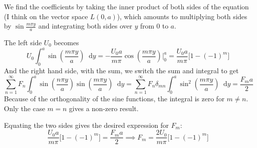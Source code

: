 \documentclass[11pt, a4paper]{article}
\newcommand{\diff}{\mathop{}\!\mathrm{d}} %
\begin{document}
\begin{itemize}
\begin{itemize}
		We find the coefficients by taking the inner product of both sides of the equation (I think on the vector space $ L(0, a) $), which amounts to multiplying both sides by $ \sin \frac{m\pi y}{a} $ and integrating both sides over $ y $ from $ 0 $ to $ a $. 
		
		The left side $ U_{0} $ becomes
		\begin{equation*}
			U_{0} \int_{0}^{a}\sin(\frac{m\pi y}{a}) \diff y = -\frac{U_{0}a}{m \pi} \cos(\frac{m\pi y}{a}) \bigg |_{0}^{a} = \frac{U_{0}a}{m \pi}\big[1 - (-1)^{m}\big]
		\end{equation*}
		And the right hand side, with the sum, we switch the sum and integral to get
		\begin{equation*}
			\sum_{n = 1}^{\infty} F_{n} \int_{0}^{a} \sin(\frac{n\pi y}{a}) \sin(\frac{m\pi y}{a} ) \diff y = \sum_{n = 1}^{\infty} F_{n} \delta_{mn} \int_{0}^{a} \sin^{2}\left (\frac{m\pi y}{a} \right ) \diff y = \frac{F_{m}a}{2}
		\end{equation*}
		Because of the orthogonality of the sine functions, the integral is zero for $ m \neq n $. Only the case $ m = n $ gives a non-zero result. 
		
		Equating the two sides gives the desired expression for $ F_{m} $:
		\begin{equation*}
			\frac{U_{0}a}{m \pi}\big[1 - (-1)^{m}\big] = \frac{F_{m}a}{2} \implies F_{m} = \frac{2U_{0}}{m\pi}\big[1 - (-1)^{m}\big]
		\end{equation*}
	\end{itemize}
	

\end{itemize}
\end{document}
